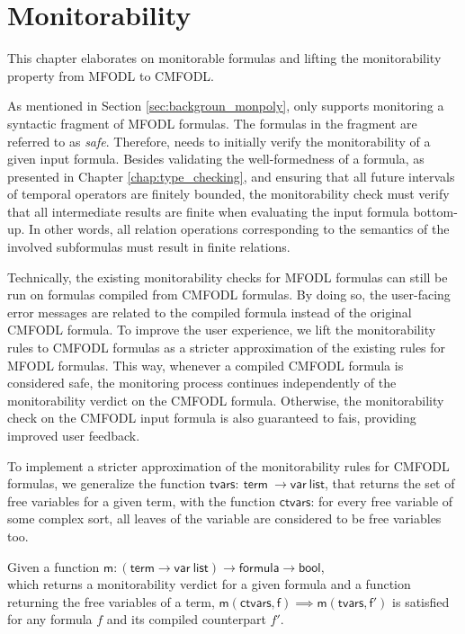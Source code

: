 \chapter{Monitorability}
\label{chap:monitorability}

This chapter elaborates on monitorable formulas and lifting the monitorability property from MFODL to CMFODL.

As mentioned in Section \ref{sec:backgroun_monpoly}, \MonPoly only supports monitoring a syntactic fragment of MFODL formulas. The formulas in the fragment are referred to as \emph{safe}. Therefore, \MonPoly needs to initially verify the monitorability of a given input formula. Besides validating the well-formedness of a formula, as presented in Chapter \ref{chap:type_checking}, and ensuring that all future intervals of temporal operators are finitely bounded, the monitorability check must verify that all intermediate results are finite when evaluating the input formula bottom-up. In other words, all relation operations corresponding to the semantics of the involved subformulas must result in finite relations.

Technically, the existing monitorability checks for MFODL formulas can still be run on formulas compiled from CMFODL formulas. By doing so, the user-facing error messages are related to the compiled formula instead of the original CMFODL formula. To improve the user experience, we lift the monitorability rules to CMFODL formulas as a stricter approximation of the existing rules for MFODL formulas. This way, whenever a compiled CMFODL formula is considered safe, the monitoring process continues independently of the monitorability verdict on the CMFODL formula. Otherwise, the monitorability check on the CMFODL input formula is also guaranteed to fais, providing improved user feedback.

To implement a stricter approximation of the monitorability rules for CMFODL formulas, we generalize the function $\mathsf{tvars:\ term\ \to var\ list}$, that returns the set of free variables for a given term, with the function $\mathsf{ctvars}$: for every free variable of some complex sort, all leaves of the variable are considered to be free variables too.

\begin{proposition}
	\label{prop:monitorability}
	Given a function $\mathsf{m: (term \to var\ list) \to formula \to bool}$, \\which returns a monitorability verdict for a given formula and a function returning the free variables of a term, $\mathsf{m(ctvars, f)} \implies \mathsf{m(tvars, f')}$ is satisfied for any formula $f$ and its compiled counterpart $f'$.
\end{proposition}

